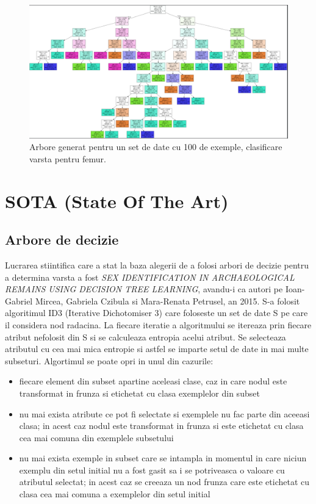 \documentclass[runningheads,a4paper,11pt]{report}
\begin{document}
\begin{figure}
\centerline{\includegraphics[width=20cm,keepaspectratio]{Imagini/tree_age_femur_100.png}}
\caption{Arbore generat pentru un set de date cu 100 de exemple, clasificare varsta pentru femur.}
\label{fig}
\end{figure}

\chapter{SOTA (State Of The Art)}
\label{chapter:sota}

\section{Arbore de decizie}
\label{sotaArboreDecizie}
Lucrarea stiintifica care a stat la baza alegerii de a folosi arbori de decizie pentru a determina varsta a fost \textit{SEX IDENTIFICATION IN ARCHAEOLOGICAL REMAINS USING DECISION TREE LEARNING}, avandu-i ca autori pe Ioan-Gabriel Mircea, Gabriela Czibula si Mara-Renata Petrusel, an 2015. \newline \newline
S-a folosit algoritimul ID3 (Iterative Dichotomiser 3) care foloseste un set de date S pe care il considera nod radacina. La fiecare iteratie a algoritmului se itereaza prin fiecare atribut nefolosit din S si se calculeaza entropia acelui atribut. Se selecteaza atributul cu cea mai mica entropie si astfel se imparte setul de date in mai multe subseturi. Algortimul se poate opri in unul din cazurile:
\begin{itemize}
  \item fiecare element din subset apartine aceleasi clase, caz in care nodul este transformat in frunza si etichetat cu clasa exemplelor din subset
  \item nu mai exista atribute ce pot fi selectate si exemplele nu fac parte din aceeasi clasa; in acest caz nodul este transformat in frunza si este etichetat cu clasa cea mai comuna din exemplele subsetului
  \item nu mai exista exemple in subset care se intampla in momentul in care niciun exemplu din setul initial nu a fost gasit sa i se potriveasca o valoare cu atributul selectat; in acest caz se creeaza un nod frunza care este etichetat cu clasa cea mai comuna a exemplelor din setul initial
\end{itemize}
\end{document}
